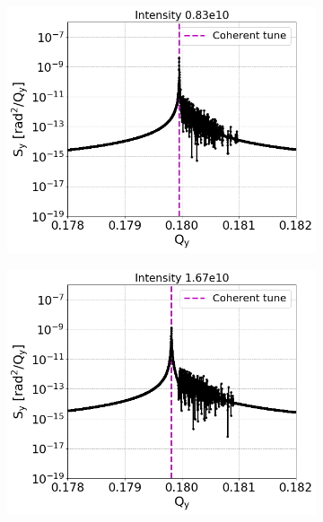 \begin{figure}[htp]
\begin{subfigure}{.45\textwidth}
    \end{subfigure}
    \begin{subfigure}{.45\textwidth}
        \centering
        \includegraphics[width=.95\linewidth]{images/Ch7/psdY_intensity0.83e10.png}  
        \label{fig:study_9c}
    \end{subfigure}
    \begin{subfigure}{.45\textwidth}
        \centering
        \includegraphics[width=.95\linewidth]{images/Ch7/psdY_intensity1.67e10.png}  
        \label{fig:study_9d}
    \end{subfigure}
    \begin{subfigure}{.45\textwidth}

\end{subfigure}
\end{figure}
